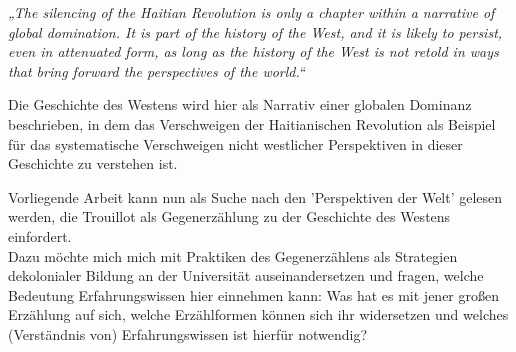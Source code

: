 \begin{myenv}
  \textit{„The silencing of the Haitian Revolution is only a chapter within a
  narrative of global domination. It is part of the history of the West, and it
is likely to persist, even in attenuated form, as long as the history of the
West is not retold in ways that bring forward the perspectives of the
world.“\footnotemark{}}
\end{myenv}
Die Geschichte des Westens wird hier als Narrativ einer globalen Dominanz
beschrieben, in dem das Verschweigen der Haitianischen Revolution als Beispiel
für das systematische Verschweigen nicht westlicher Perspektiven in dieser
Geschichte zu verstehen ist. 

Vorliegende Arbeit kann nun als Suche nach den 'Perspektiven der Welt' gelesen
werden, die Trouillot als Gegenerzählung zu der Geschichte des Westens
einfordert.\\
Dazu möchte mich mich mit Praktiken des Gegenerzählens als Strategien
dekolonialer Bildung an der Universität auseinandersetzen und fragen, welche
Bedeutung Erfahrungswissen hier einnehmen kann: Was hat es mit jener großen
Erzählung auf sich, welche Erzählformen können sich ihr widersetzen und welches
(Verständnis von) Erfahrungswissen ist hierfür notwendig?


